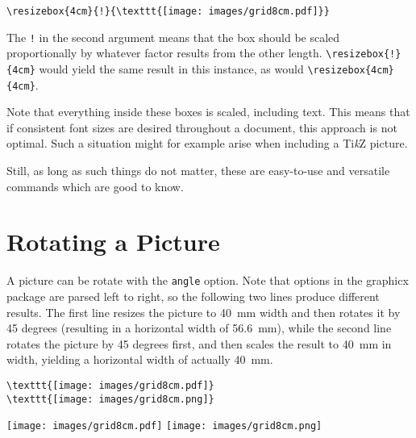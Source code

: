 \documentclass[a4paper,11pt]{article}
\newcommand\code[1]{\texttt{#1}}
\begin{document}
\begin{verbatim}
\resizebox{4cm}{!}{\texttt{[image: images/grid8cm.pdf]}}
\end{verbatim}

The  \code{!}   in  the  second  argument   means  that  the  box   should  be
scaled  proportionally  by whatever  factor  results  from the  other  length.
\code{\textbackslash{}resizebox\{!\}\{4cm\}}  would yield  the same  result in
this instance, as would \code{\textbackslash{}resizebox\{4cm\}\{4cm\}}.

\vspace{1em}


\vspace{1em}

Note that everything inside these  boxes is scaled, including text. This means
that  if  consistent font  sizes  are  desired  throughout a   document,  this
approach  is  not optimal. Such  a  situation  might  for example  arise  when
including a Ti\emph{k}Z picture.

Still,  as long  as  such things  do  not matter,  these  are easy-to-use  and
versatile commands which are good to know.


\newpage
\section{Rotating a Picture}

A picture can be rotate with the \code{angle} option. Note that options in the
graphicx package are parsed left to  right, so the following two lines produce
different results. The first line resizes the picture to \SI{40}{\milli\meter}
width and then  rotates it by 45  degrees (resulting in a  horizontal width of
\SI{56.6}{\milli\meter}),  while the  second line  rotates the  picture by  45
degrees first, and  then scales the result to  \SI{40}{\milli\meter} in width,
yielding a horizontal width of actually \SI{40}{\milli\meter}.

\begin{verbatim}
\texttt{[image: images/grid8cm.pdf]}
\texttt{[image: images/grid8cm.png]}
\end{verbatim}

\texttt{[image: images/grid8cm.pdf]}
\texttt{[image: images/grid8cm.png]}
\end{document}
